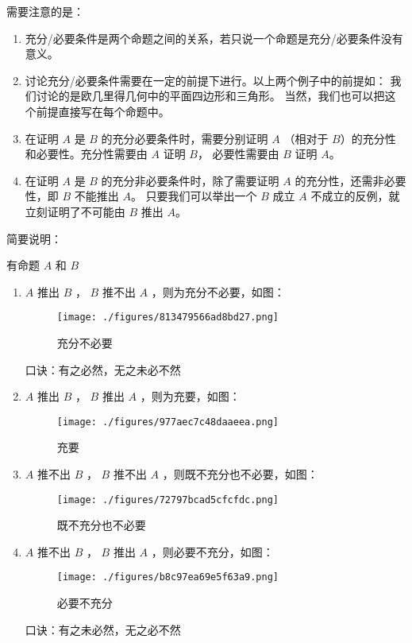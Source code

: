 需要注意的是：
\begin{enumerate}
\item 充分/必要条件是两个命题之间的关系，若只说一个命题是充分/必要条件没有意义。
\item 讨论充分/必要条件需要在一定的前提下进行。以上两个例子中的前提如： 我们讨论的是欧几里得几何中的平面四边形和三角形。 当然，我们也可以把这个前提直接写在每个命题中。
\item 在证明 $A$ 是 $B$ 的充分必要条件时，需要分别证明 $A$ （相对于 $B$）的充分性和必要性。充分性需要由 $A$ 证明 $B$， 必要性需要由 $B$ 证明 $A$。 
\item 在证明 $A$ 是 $B$ 的充分非必要条件时，除了需要证明 $A$ 的充分性，还需非必要性，即 $B$ 不能推出 $A$。 只要我们可以举出一个 $B$ 成立 $A$ 不成立的反例，就立刻证明了不可能由 $B$ 推出 $A$。 
\end{enumerate}

简要说明：

有命题 $A$ 和 $B$ 
\begin{enumerate}
\item $A$ 推出 $B$ ， $B$ 推不出 $A$ ，则为充分不必要，如图：
\begin{figure}[ht]
\centering
\texttt{[image: ./figures/813479566ad8bd27.png]}
\caption{充分不必要} \label{fig_SufCnd_2}
\end{figure}
口诀：有之必然，无之未必不然
\item $A$ 推出 $B$ ， $B$ 推出 $A$ ，则为充要，如图：\begin{figure}[ht]
\centering
\texttt{[image: ./figures/977aec7c48daaeea.png]}
\caption{充要} \label{fig_SufCnd_3}
\end{figure}
\item $A$ 推不出 $B$ ， $B$ 推不出 $A$ ，则既不充分也不必要，如图：\begin{figure}[ht]
\centering
\texttt{[image: ./figures/72797bcad5cfcfdc.png]}
\caption{既不充分也不必要} \label{fig_SufCnd_4}
\end{figure}
\item $A$ 推不出 $B$ ， $B$ 推出 $A$ ，则必要不充分，如图：\begin{figure}[ht]
\centering
\texttt{[image: ./figures/b8c97ea69e5f63a9.png]}
\caption{必要不充分} \label{fig_SufCnd_5}
\end{figure}
口诀：有之未必然，无之必不然
\end {enumerate}





